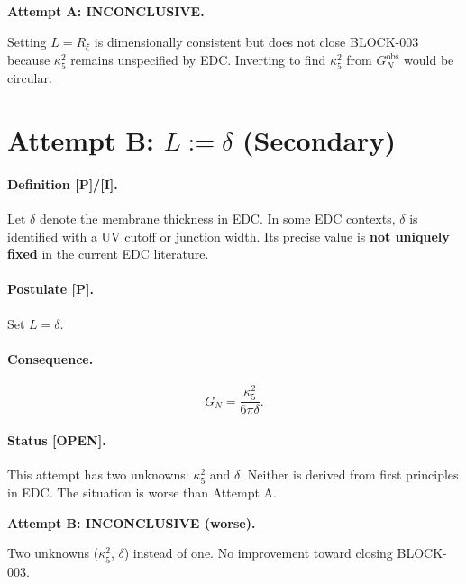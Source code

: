\documentclass[11pt,a4paper]{article}
\newcommand{\tagI}{\textcolor{green!50!black}{[I]}}
\newcommand{\tagP}{\textcolor{orange!80!black}{[P]}}
\newcommand{\tagOPEN}{\textcolor{red!70!black}{[OPEN]}}
\begin{document}
\begin{failbox}
\textbf{Attempt A: INCONCLUSIVE.}

Setting $L = R_\xi$ is dimensionally consistent but does not close BLOCK-003 because $\kappa_5^2$ remains unspecified by EDC.
Inverting to find $\kappa_5^2$ from $G_N^{\text{obs}}$ would be circular.
\end{failbox}

\section{Attempt B: $L := \delta$ (Secondary)}
\label{sec:attempt_B}

\paragraph{Definition \tagP{}/\tagI{}.}
Let $\delta$ denote the membrane thickness in EDC.
In some EDC contexts, $\delta$ is identified with a UV cutoff or junction width.
Its precise value is \textbf{not uniquely fixed} in the current EDC literature.

\paragraph{Postulate \tagP{}.}
Set $L = \delta$.

\paragraph{Consequence.}
\begin{equation}
    G_N = \frac{\kappa_5^2}{6\pi \delta}.
\end{equation}

\paragraph{Status \tagOPEN{}.}
This attempt has two unknowns: $\kappa_5^2$ and $\delta$.
Neither is derived from first principles in EDC.
The situation is worse than Attempt A.

\begin{failbox}
\textbf{Attempt B: INCONCLUSIVE (worse).}

Two unknowns ($\kappa_5^2$, $\delta$) instead of one.
No improvement toward closing BLOCK-003.
\end{failbox}
\end{document}
